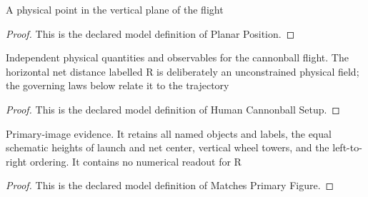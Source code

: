 \begin{definition}
  \label{def:physics:phyx-mini-0743:phyxminiproblems-problemphyxmini0743-planarposition}
  A physical point in the vertical plane of the flight
\end{definition}
\begin{proof}
  This is the declared model definition of Planar Position.
\end{proof}
\begin{definition}
  \label{def:physics:phyx-mini-0743:phyxminiproblems-problemphyxmini0743-humancannonballsetup}
  Independent physical quantities and observables for the cannonball flight. The horizontal net distance labelled R is deliberately an unconstrained physical field; the governing laws below relate it to the trajectory
\end{definition}
\begin{proof}
  This is the declared model definition of Human Cannonball Setup.
\end{proof}
\begin{definition}
  \label{def:physics:phyx-mini-0743:phyxminiproblems-problemphyxmini0743-matchesprimaryfigure}
  Primary-image evidence. It retains all named objects and labels, the equal schematic heights of launch and net center, vertical wheel towers, and the left-to-right ordering. It contains no numerical readout for R
\end{definition}
\begin{proof}
  This is the declared model definition of Matches Primary Figure.
\end{proof}

